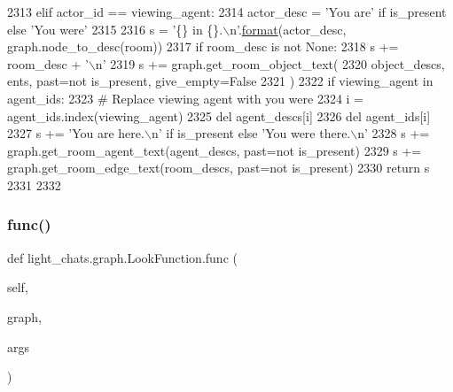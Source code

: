 \begin{DoxyCode}
2313             \textcolor{keywordflow}{elif} actor\_id == viewing\_agent:
2314                 actor\_desc = \textcolor{stringliteral}{'You are'} \textcolor{keywordflow}{if} is\_present \textcolor{keywordflow}{else} \textcolor{stringliteral}{'You were'}
2315 
2316             s = \textcolor{stringliteral}{'\{\} in \{\}.\(\backslash\)n'}.\hyperlink{namespaceparlai_1_1chat__service_1_1services_1_1messenger_1_1shared__utils_a32e2e2022b824fbaf80c747160b52a76}{format}(actor\_desc, graph.node\_to\_desc(room))
2317             \textcolor{keywordflow}{if} room\_desc \textcolor{keywordflow}{is} \textcolor{keywordflow}{not} \textcolor{keywordtype}{None}:
2318                 s += room\_desc + \textcolor{stringliteral}{'\(\backslash\)n'}
2319             s += graph.get\_room\_object\_text(
2320                 object\_descs, ents, past=\textcolor{keywordflow}{not} is\_present, give\_empty=\textcolor{keyword}{False}
2321             )
2322             \textcolor{keywordflow}{if} viewing\_agent \textcolor{keywordflow}{in} agent\_ids:
2323                 \textcolor{comment}{# Replace viewing agent with you were}
2324                 i = agent\_ids.index(viewing\_agent)
2325                 del agent\_descs[i]
2326                 del agent\_ids[i]
2327                 s += \textcolor{stringliteral}{'You are here.\(\backslash\)n'} \textcolor{keywordflow}{if} is\_present \textcolor{keywordflow}{else} \textcolor{stringliteral}{'You were there.\(\backslash\)n'}
2328             s += graph.get\_room\_agent\_text(agent\_descs, past=\textcolor{keywordflow}{not} is\_present)
2329             s += graph.get\_room\_edge\_text(room\_descs, past=\textcolor{keywordflow}{not} is\_present)
2330             \textcolor{keywordflow}{return} s
2331 
2332 
\end{DoxyCode}
\mbox{\label{classlight__chats_1_1graph_1_1LookFunction_aeaedd1fa680a930dc86a1120d9daf63d}} 
\subsubsection{\texorpdfstring{func()}{func()}}
{\footnotesize\ttfamily def light\+\_\+chats.\+graph.\+Look\+Function.\+func (\begin{DoxyParamCaption}\item[{}]{self,  }\item[{}]{graph,  }\item[{}]{args }\end{DoxyParamCaption})}



